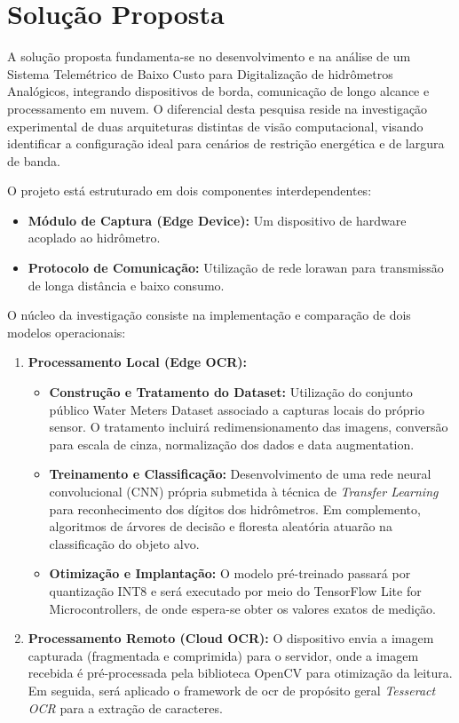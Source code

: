 \section{Solução Proposta}
\label{sec:solucao}

A solução proposta fundamenta-se no desenvolvimento e na análise de um Sistema Telemétrico de Baixo Custo para Digitalização de hidrômetros Analógicos, integrando dispositivos de borda, comunicação de longo alcance e processamento em nuvem. O diferencial desta pesquisa reside na investigação experimental de duas arquiteturas distintas de visão computacional, visando identificar a configuração ideal para cenários de restrição energética e de largura de banda.

O projeto está estruturado em dois componentes interdependentes:

\begin{itemize}
    \item \textbf{Módulo de Captura (Edge Device):} Um dispositivo de hardware acoplado ao hidrômetro.
    \item \textbf{Protocolo de Comunicação:} Utilização de rede \gls{lorawan} para transmissão de longa distância e baixo consumo.
\end{itemize}

O núcleo da investigação consiste na implementação e comparação de dois modelos operacionais:

\begin{enumerate}
    \item \textbf{Processamento Local (Edge OCR):} 
      \begin{itemize}
        \item \textbf{Construção e Tratamento do Dataset:} Utilização do conjunto público Water Meters Dataset  associado a capturas locais do próprio sensor. O tratamento incluirá redimensionamento das imagens, conversão para escala de cinza, normalização dos dados e data augmentation.
        \item \textbf{Treinamento e Classificação:} Desenvolvimento de uma rede neural convolucional (CNN) própria submetida à técnica de \textit{Transfer Learning} para reconhecimento dos dígitos dos hidrômetros. Em complemento, algoritmos de árvores de decisão e floresta aleatória atuarão na classificação do objeto alvo.
        \item \textbf{Otimização e Implantação:} O modelo pré-treinado passará por quantização INT8 e será executado por meio do TensorFlow Lite for Microcontrollers, de onde espera-se obter os valores exatos de medição.
      \end{itemize}
    \item \textbf{Processamento Remoto (Cloud OCR):} O dispositivo envia a imagem capturada (fragmentada e comprimida) para o servidor, onde a imagem recebida é pré-processada pela biblioteca OpenCV para otimização da leitura. Em seguida, será aplicado o framework de \gls{ocr} de propósito geral \textit{Tesseract OCR} para a extração de caracteres.
\end{enumerate}

